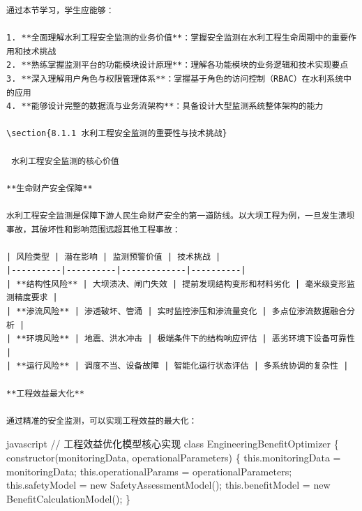 \begin{lstlisting}
通过本节学习，学生应能够：

1. **全面理解水利工程安全监测的业务价值**：掌握安全监测在水利工程生命周期中的重要作用和技术挑战
2. **熟练掌握监测平台的功能模块设计原理**：理解各功能模块的业务逻辑和技术实现要点
3. **深入理解用户角色与权限管理体系**：掌握基于角色的访问控制（RBAC）在水利系统中的应用
4. **能够设计完整的数据流与业务流架构**：具备设计大型监测系统整体架构的能力

\section{8.1.1 水利工程安全监测的重要性与技术挑战}

 水利工程安全监测的核心价值

**生命财产安全保障**

水利工程安全监测是保障下游人民生命财产安全的第一道防线。以大坝工程为例，一旦发生溃坝事故，其破坏性和影响范围远超其他工程事故：

| 风险类型 | 潜在影响 | 监测预警价值 | 技术挑战 |
|----------|----------|-------------|----------|
| **结构性风险** | 大坝溃决、闸门失效 | 提前发现结构变形和材料劣化 | 毫米级变形监测精度要求 |
| **渗流风险** | 渗透破坏、管涌 | 实时监控渗压和渗流量变化 | 多点位渗流数据融合分析 |
| **环境风险** | 地震、洪水冲击 | 极端条件下的结构响应评估 | 恶劣环境下设备可靠性 |
| **运行风险** | 调度不当、设备故障 | 智能化运行状态评估 | 多系统协调的复杂性 |

**工程效益最大化**

通过精准的安全监测，可以实现工程效益的最大化：
\end{lstlisting}

javascript // 工程效益优化模型核心实现 class EngineeringBenefitOptimizer \{ constructor(monitoringData, operationalParameters) \{ this.monitoringData = monitoringData; this.operationalParams = operationalParameters; this.safetyModel = new SafetyAssessmentModel(); this.benefitModel = new BenefitCalculationModel(); \}

